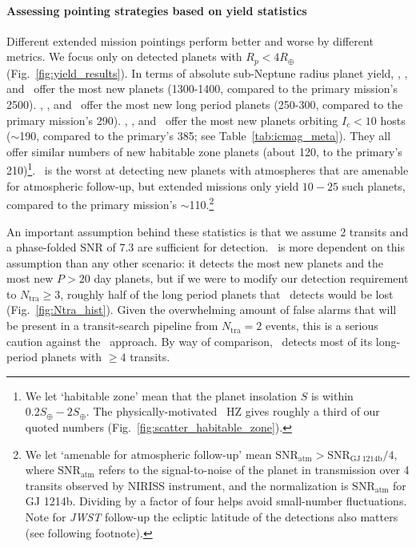\paragraph{Assessing pointing strategies based on yield statistics} 
Different extended mission pointings perform better and worse by different metrics.
We focus only on detected planets with $R_p<4R_\oplus$ (Fig.~\ref{fig:yield_results}).
In terms of absolute sub-Neptune radius planet yield, \hemis, \npole, and \shemiAvoid\ offer the most new planets (1300-1400, compared to the primary mission's 2500).
\hemis, \npole, and \nhemi\ offer the most new long period planets (250-300, compared to the primary mission's 290).
\hemis, \shemiAvoid, and \eshort\ offer the most new planets orbiting $I_c<10$ hosts ($\sim$190, compared to the primary's 385; see Table~\ref{tab:icmag_meta}).
They all offer similar numbers of new habitable zone planets (about 120, to the primary's 210)\footnote{We let `habitable zone' mean that the planet insolation $S$ is within $0.2S_\oplus-2S_\oplus$. The physically-motivated~\protect\citet{kopparapu_habitable_2013} HZ gives roughly a third of our quoted numbers (Fig.~\protect\ref{fig:scatter_habitable_zone}).}.
\npole\ is the worst at detecting new planets with atmospheres that are amenable for atmospheric follow-up, but extended missions only yield $10-25$ such planets, compared to the primary mission's $\sim$110.\footnote{We let `amenable for atmospheric follow-up' mean $\mathrm{SNR}_\mathrm{atm} > \mathrm{SNR}_\mathrm{GJ\ 1214b}/4 $, where $\mathrm{SNR}_\mathrm{atm}$ refers to the signal-to-noise of the planet in transmission over 4 transits observed by \jwsts NIRISS instrument, and the normalization is $\mathrm{SNR}_\mathrm{atm}$ for GJ 1214b. Dividing by a factor of four helps avoid small-number fluctuations. Note for \textit{JWST} follow-up the ecliptic latitude of the detections also matters (see following footnote).}

An important assumption behind these statistics is that we assume 2 transits and a phase-folded SNR of 7.3 are sufficient for detection.
\hemis\ is more dependent on this assumption than any other scenario: it detects the most new planets and the most new $P>20$ day planets, but if we were to modify our detection requirement to $N_\mathrm{tra}\geq 3$, roughly half of the long period planets that \hemis\ detects would be lost (Fig.~\ref{fig:Ntra_hist}).
Given the overwhelming amount of false alarms that will be present in a transit-search pipeline from $N_\mathrm{tra} = 2$ events, this is a serious caution against the \hemis\ approach.
By way of comparison, \npole\ detects most of its long-period planets with $\ge 4$ transits.


